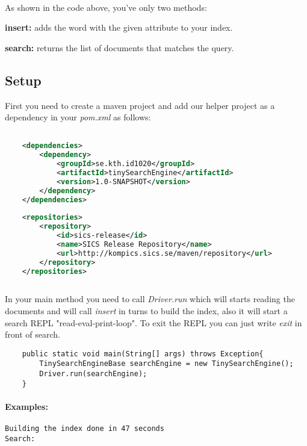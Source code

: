 \documentclass[11pt]{article}
\begin{document}
\paragraph{}
As shown in the code above, you've only two methods:
\begin{description}
\item \textbf{insert:} adds the word with the given attribute to your index.
\item \textbf{search:} returns the list of documents that matches the query.
\end{description}

\newpage
\subsection{Setup}
First you need to create a maven project and add our helper project as a dependency in your \textit{pom.xml} as follows:

\begin{lstlisting}[language=XML]

    <dependencies>
        <dependency>
            <groupId>se.kth.id1020</groupId>
            <artifactId>tinySearchEngine</artifactId>
            <version>1.0-SNAPSHOT</version>
        </dependency>
    </dependencies>
    
    <repositories>
        <repository>
            <id>sics-release</id>
            <name>SICS Release Repository</name>
            <url>http://kompics.sics.se/maven/repository</url>
        </repository>
    </repositories>
    
\end{lstlisting}

In your main method you need to call \textit{Driver.run} which will starts reading the documents and will call \textit{insert} in turns to build the index, also it will start a  search REPL "read-eval-print-loop". To exit the REPL you can just write \textit{exit} in front of search.

\begin{lstlisting}
    public static void main(String[] args) throws Exception{
        TinySearchEngineBase searchEngine = new TinySearchEngine();
        Driver.run(searchEngine);
    }
\end{lstlisting}

\paragraph{\textbf{Examples:}}
\begin{verbatim}
Building the index done in 47 seconds
Search: 
\end{verbatim}
\end{document}
